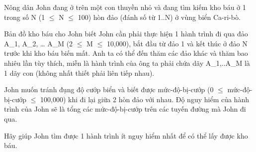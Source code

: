 Nông dân John đang ở trên một con thuyền nhỏ và đang tìm kiếm  kho báu ở 1 trong số N (1  $\le$  N  $\le$  100) hòn đảo (đánh số từ 1..N)  ở vùng biển Ca-ri-bò.  

   Bản đồ kho báu cho John biết John cần phải thực hiện 1 hành  trình đi qua đảo A\_1, A\_2, … A\_M (2  $\le$  M  $\le$  10,000), bắt đầu từ  đảo 1 và kết thúc ở đảo N trước khi kho báu biến mất. Anh ta có thể  đến thăm các đảo khác và thăm bao nhiêu lần tùy thích, miễn là hành  trình của ông ta phải chứa dãy A\_1,..A\_M là 1 dãy con (không nhất  thiết phải liên tiếp nhau).  

   John muốn tránh đụng độ cướp biển và biết được mức-độ-bị-cướp  (0  $\le$  mức-độ-bị-cướp  $\le$  100,000) khi đi lại giữa 2 hòn đảo với  nhau. Độ nguy hiểm của hành trình của John sẽ là tổng các mức-độ-bị-cướp  trên các tuyến đường mà John đi qua.  

   Hãy giúp John tìm được 1 hành trình ít nguy hiểm nhất để  có thể lấy được kho báu.  

\